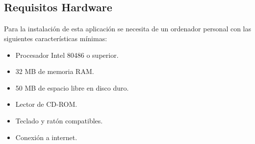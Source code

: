 \subsection{Requisitos Hardware}

  \paragraph{}Para la instalación de esta aplicación se necesita de un ordenador
  personal con las siguientes características mínimas:

  \begin{itemize}
   \item Procesador Intel 80486 o superior.
   \item 32 MB de memoria RAM.
   \item 50 MB de espacio libre en disco duro.
   \item Lector de CD-ROM.
   \item Teclado y ratón compatibles.
   \item Conexión a internet.
  \end{itemize}

